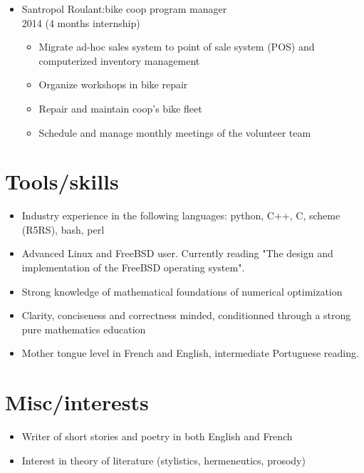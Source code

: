 \documentclass{article}
\begin{document}
\begin{itemize}
  \item Santropol Roulant:\@ bike coop program manager\\ 2014 (4 months internship)
    \begin{itemize}
      \item Migrate ad-hoc sales system to point of sale system (POS) and computerized inventory management
      \item Organize workshops in bike repair
      \item Repair and maintain coop's bike fleet
      \item Schedule and manage monthly meetings of the volunteer team
    \end{itemize}

\end{itemize}

\section*{Tools/skills}
\begin{itemize}
  \item Industry experience in the following languages: python, C++, C, scheme (R5RS), bash, perl
  \item Advanced Linux and FreeBSD user. Currently reading "The design and implementation of the FreeBSD operating system".
  \item Strong knowledge of mathematical foundations of numerical optimization
  \item Clarity, conciseness and correctness minded, conditionned through a strong pure mathematics education
  \item Mother tongue level in French and English, intermediate Portuguese reading.
\end{itemize}

\section*{Misc/interests}
\begin{itemize}
  \item Writer of short stories and poetry in both English and French
  \item Interest in theory of literature (stylistics, hermeneutics, prosody)
\end{itemize}
\end{document}
